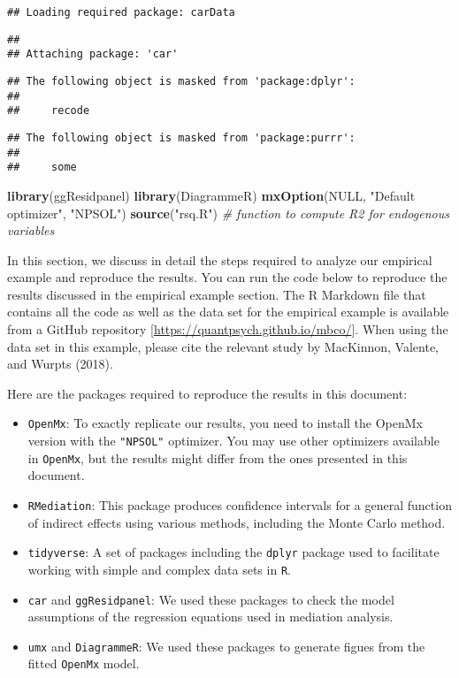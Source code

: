 \documentclass[11pt,]{article}
\newenvironment{Shaded}{\begin{snugshade}}{\end{snugshade}}
\newcommand{\CommentTok}[1]{\textcolor[rgb]{0.56,0.35,0.01}{\textit{#1}}}
\newcommand{\KeywordTok}[1]{\textcolor[rgb]{0.13,0.29,0.53}{\textbf{#1}}}
\newcommand{\NormalTok}[1]{#1}
\newcommand{\OtherTok}[1]{\textcolor[rgb]{0.56,0.35,0.01}{#1}}
\newcommand{\StringTok}[1]{\textcolor[rgb]{0.31,0.60,0.02}{#1}}
\providecommand{\tightlist}{%
  \setlength{\itemsep}{0pt}\setlength{\parskip}{0pt}}
\begin{document}
\begin{verbatim}
## Loading required package: carData
\end{verbatim}

\begin{verbatim}
## 
## Attaching package: 'car'
\end{verbatim}

\begin{verbatim}
## The following object is masked from 'package:dplyr':
## 
##     recode
\end{verbatim}

\begin{verbatim}
## The following object is masked from 'package:purrr':
## 
##     some
\end{verbatim}

\begin{Shaded}
\begin{Highlighting}[]
\KeywordTok{library}\NormalTok{(ggResidpanel)}
\KeywordTok{library}\NormalTok{(DiagrammeR)}
\KeywordTok{mxOption}\NormalTok{(}\OtherTok{NULL}\NormalTok{, }\StringTok{"Default optimizer"}\NormalTok{, }\StringTok{"NPSOL"}\NormalTok{)}
\KeywordTok{source}\NormalTok{(}\StringTok{"rsq.R"}\NormalTok{) }\CommentTok{# function to compute R2 for endogenous variables}
\end{Highlighting}
\end{Shaded}

In this section, we discuss in detail the steps required to analyze our
empirical example and reproduce the results. You can run the code below
to reproduce the results discussed in the empirical example section. The
R Markdown file that contains all the code as well as the data set for
the empirical example is available from a GitHub repository
{[}\url{https://quantpsych.github.io/mbco/}{]}. When using the data set
in this example, please cite the relevant study by MacKinnon, Valente,
and Wurpts (2018).

Here are the packages required to reproduce the results in this
document:

\begin{itemize}
\tightlist
\item
  \texttt{OpenMx}: To exactly replicate our results, you need to install
  the OpenMx version with the \texttt{"NPSOL"} optimizer. You may use
  other optimizers available in \texttt{OpenMx}, but the results might
  differ from the ones presented in this document.
\item
  \texttt{RMediation}: This package produces confidence intervals for a
  general function of indirect effects using various methods, including
  the Monte Carlo method.
\item
  \texttt{tidyverse}: A set of packages including the \texttt{dplyr}
  package used to facilitate working with simple and complex data sets
  in \texttt{R}.
\item
  \texttt{car} and \texttt{ggResidpanel}: We used these packages to
  check the model assumptions of the regression equations used in
  mediation analysis.
\item
  \texttt{umx} and \texttt{DiagrammeR}: We used these packages to
  generate figues from the fitted \texttt{OpenMx} model.
\end{itemize}
\end{document}

